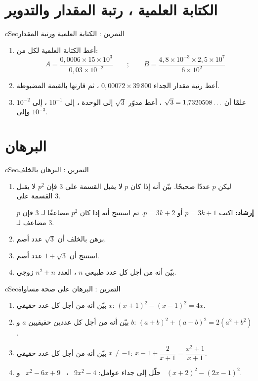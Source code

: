 \documentclass[12pt,a4paper]{article}
\newenvironment{BOX}[2]{\begin{otherlanguage}{english}\begin{arbox}{#1}{#2}}{\end{arbox}\end{otherlanguage}}
\newcounter{exo}
\newenvironment{tamrin}[1]{\stepcounter{exo}\begin{BOX}{cSec}{التمرين \theexo: #1}}{\end{BOX}}
\renewcommand{\dots}{\mathinner{\ldotp\ldotp\ldotp}}
\begin{document}
\section{الكتابة العلمية ، رتبة المقدار والتدوير}
\begin{tamrin}{الكتابة العلمية ورتبة المقدار}
\begin{enumerate}
\item أعط الكتابة العلمية لكل من:
\[A=\frac{0{,}0006\times15\times10^3}{0{,}03\times10^{-2}}\qquad;\qquad B=\frac{4{,}8\times10^{-3}\times2{,}5\times10^7}{6\times10^2}\]
\item أعط رتبة مقدار الجداء $0{,}00072\times39\,800$ ، ثم قارنها بالقيمة المضبوطة.
\item علمًا أن $\sqrt3=1{,}7320508\dots$ ، أعط مدوّر $\sqrt3$ إلى الوحدة ، إلى $10^{-1}$ ، إلى $10^{-2}$ وإلى $10^{-3}$.
\end{enumerate}
\end{tamrin}

\section{البرهان}
\begin{tamrin}{البرهان بالخلف}
\begin{enumerate}
\item ليكن $p$ عددًا صحيحًا. بيّن أنه إذا كان $p$ لا يقبل القسمة على $3$ فإن $p^2$ لا يقبل القسمة على $3$.\par
\textbf{إرشاد:} اكتب $p=3k+1$ أو $p=3k+2$. ثم استنتج أنه إذا كان $p^2$ مضاعفًا لـ $3$ فإن $p$ مضاعف لـ $3$.
\item برهن بالخلف أن $\sqrt3$ عدد أصم.
\item استنتج أن $1+\sqrt3$ عدد أصم.
\item بيّن أنه من أجل كل عدد طبيعي $n$ ، العدد $n^2+n$ زوجي.
\end{enumerate}
\end{tamrin}

\begin{tamrin}{البرهان على صحة مساواة}
\begin{enumerate}
\item بيّن أنه من أجل كل عدد حقيقي $x$: $(x+1)^2-(x-1)^2=4x$.
\item بيّن أنه من أجل كل عددين حقيقيين $a$ و $b$: $(a+b)^2+(a-b)^2=2\left(a^2+b^2\right)$.
\item بيّن أنه من أجل كل عدد حقيقي $x\neq-1$: $x-1+\dfrac2{x+1}=\dfrac{x^2+1}{x+1}$.
\item حلّل إلى جداء عوامل: $9x^2-4$ \ ، \ $x^2-6x+9$ \ و \ $(x+2)^2-(2x-1)^2$.
\end{enumerate}
\end{tamrin}
\end{document}
